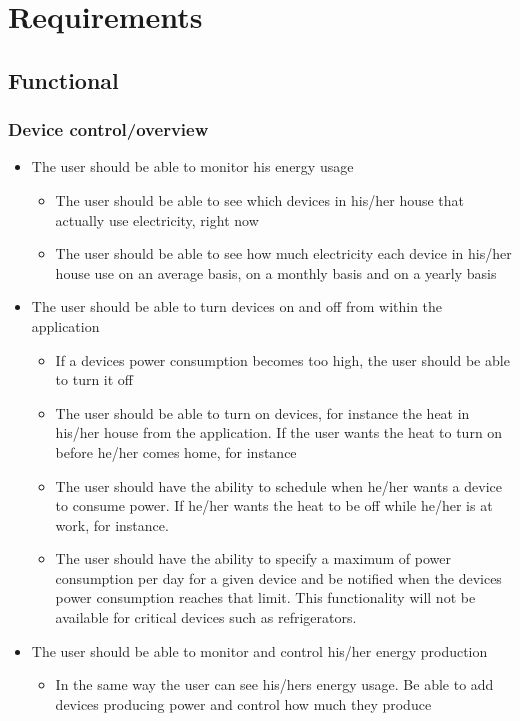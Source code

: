 \section{Requirements}
\subsection{Functional}

\subsubsection{Device control/overview}
\begin{itemize}
\item The user should be able to monitor his energy usage
\begin{itemize}
\item The user should be able to see which devices in his/her house that actually use electricity, right now
\item The user should be able to see how much electricity each device in his/her house use on an average basis, on a monthly basis and on a yearly basis 
\end{itemize}

\item The user should be able to turn devices on and off from within the application
\begin{itemize}
\item If a devices power consumption becomes too high, the user should be able to turn it off
\item The user should be able to turn on devices, for instance the heat in his/her house from the application. If the user wants the heat to turn on before he/her comes home, for instance
\item The user should have the ability to schedule when he/her wants a device to consume power. If he/her wants the heat to be off while he/her is at work, for instance. 
\item The user should have the ability to specify a maximum of power 
consumption per day for a given device and be notified when the devices power
consumption reaches that limit. This functionality will not be available
for critical devices such as refrigerators. 
\end{itemize}

\item The user should be able to monitor and control his/her energy production
\begin{itemize}
\item In the same way the user can see his/hers energy usage. Be able to add devices producing power and control how much they produce
\end{itemize}
\end{itemize}

